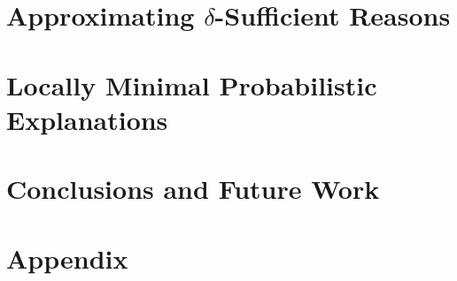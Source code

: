 \documentclass[11pt, letterpaper]{article}
\begin{document}
\section{Approximating \texorpdfstring{$\delta$}{delta}-Sufficient Reasons}
\label{sec-comp-problem}


\section{Locally Minimal Probabilistic Explanations}
\label{sec-loc-min}


\section{Conclusions and Future Work}
\label{sec-conclusions}






\newpage
\onecolumn
\appendix
\section*{Appendix}

\end{document}
